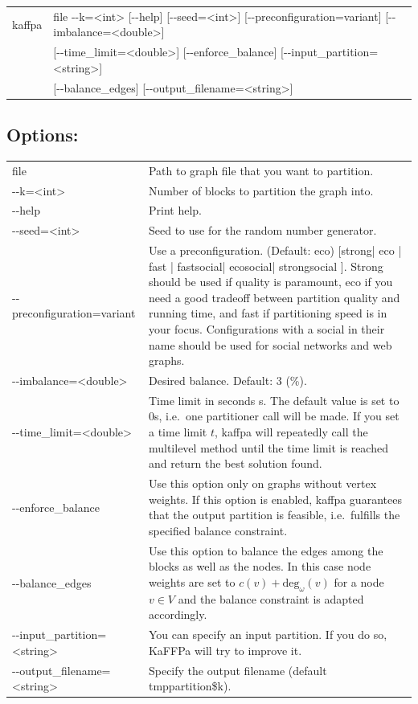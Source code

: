 \documentclass[11pt]{article}
\newcommand{\ie}{i.e.\ }
\begin{document}
\begin{tabular}{ll}
kaffpa &   file -{}-k=<int> [-{}-help] [-{}-seed=<int>]  [-{}-preconfiguration=variant] [-{}-imbalance=<double>] \\
       &  [-{}-time\_limit=<double>] [-{}-enforce\_balance] [-{}-input\_partition=<string>] \\
       & [-{}-balance\_edges] [-{}-output\_filename=<string>]
\end{tabular}
                          
\subsection*{Options:\\}

\begin{tabularx}{\textwidth}{lX}
  file                        & Path to graph file that you want to partition. \\
  -{}-k=<int>                   & Number of blocks to partition the graph into. \\
  -{}-help                      & Print help. \\
  -{}-seed=<int>                & Seed to use for the random number generator. \\
  -{}-preconfiguration=variant & Use a preconfiguration. (Default: eco) [strong| eco | fast | fastsocial| ecosocial| strongsocial ]. Strong should be used if quality is paramount, eco if you need a good tradeoff between partition quality and running time, and fast if partitioning speed is in your focus. Configurations with a social in their name should be used for social networks and web graphs. \\
  -{}-imbalance=<double>        & Desired balance. Default: 3 (\%). \\
  -{}-time\_limit=<double>      & Time limit in seconds s. The default value is set to 0s, \ie one partitioner call will be made. If you set a time limit $t$, kaffpa will repeatedly call the multilevel method until the time limit is reached and return the best solution found. \\
  -{}-enforce\_balance          & Use this option only on graphs without vertex weights. If this option is enabled, kaffpa guarantees that the output partition is feasible, \ie fulfills the specified balance constraint. \\
  -{}-balance\_edges          & Use this option to balance the edges among the blocks as well as the nodes. In this case node weights are set to $c(v)+\text{deg}_\omega(v)$ for a node $v\in V$ and the balance constraint is adapted accordingly. \\
  -{}-input\_partition=<string> & You can specify an input partition. If you do so, KaFFPa will try to improve it.   \\
  -{}-output\_filename=<string>               & Specify the output filename (default tmppartition\$k). \\
\end{tabularx}
\vfill
\pagebreak
\end{document}
